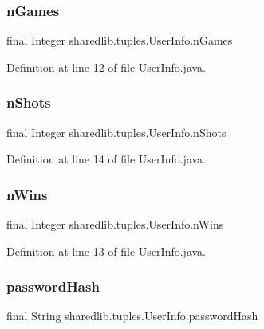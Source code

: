 \subsubsection{\texorpdfstring{n\+Games}{nGames}}
{\footnotesize\ttfamily final Integer sharedlib.\+tuples.\+User\+Info.\+n\+Games}



Definition at line 12 of file User\+Info.\+java.

\hypertarget{classsharedlib_1_1tuples_1_1_user_info_aaafc1c84d64409331d72709349653130}{}\label{classsharedlib_1_1tuples_1_1_user_info_aaafc1c84d64409331d72709349653130} 
\subsubsection{\texorpdfstring{n\+Shots}{nShots}}
{\footnotesize\ttfamily final Integer sharedlib.\+tuples.\+User\+Info.\+n\+Shots}



Definition at line 14 of file User\+Info.\+java.

\hypertarget{classsharedlib_1_1tuples_1_1_user_info_ab74910b9bc813f5090314372da220c04}{}\label{classsharedlib_1_1tuples_1_1_user_info_ab74910b9bc813f5090314372da220c04} 
\subsubsection{\texorpdfstring{n\+Wins}{nWins}}
{\footnotesize\ttfamily final Integer sharedlib.\+tuples.\+User\+Info.\+n\+Wins}



Definition at line 13 of file User\+Info.\+java.

\hypertarget{classsharedlib_1_1tuples_1_1_user_info_ac680e59ba2bbe5e5c754977c393729da}{}\label{classsharedlib_1_1tuples_1_1_user_info_ac680e59ba2bbe5e5c754977c393729da} 
\subsubsection{\texorpdfstring{password\+Hash}{passwordHash}}
{\footnotesize\ttfamily final String sharedlib.\+tuples.\+User\+Info.\+password\+Hash}




